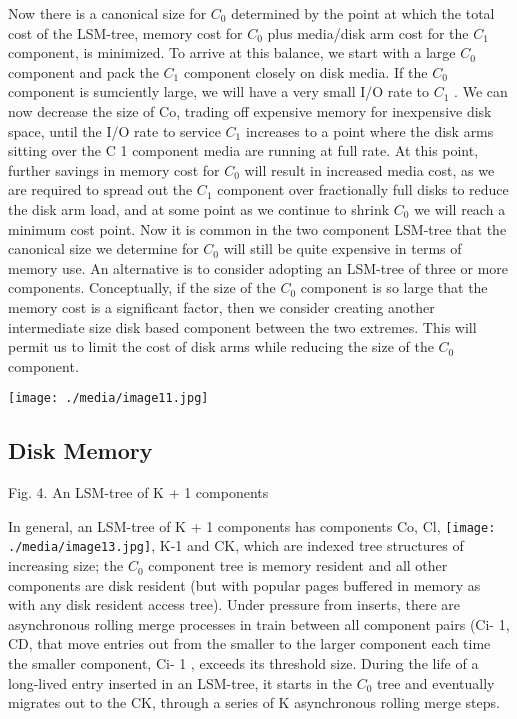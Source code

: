 \documentclass[a4paper,12pt,notitlepage,twoside,openright]{article}
\begin{document}
Now there is a canonical size for \(C_0\) determined by the point at which
the total cost of the LSM-tree, memory cost for \(C_0\) plus media/disk arm
cost for the \(C_1\) component, is minimized. To arrive at this balance, we
start with a large \(C_0\) component and pack the \(C_1\) component closely on
disk media. If the \(C_0\) component is sumciently large, we will have a very
small I/O rate to \(C_1\) . We can now decrease the size of Co, trading off
expensive memory for inexpensive disk space, until the I/O rate to
service \(C_1\) increases to a point where the disk arms sitting over the C 1
component media are running at full rate. At this point, further savings
in memory cost for \(C_0\) will result in increased media cost, as we are
required to spread out the \(C_1\) component over fractionally full disks to
reduce the disk arm load, and at some point as we continue to shrink \(C_0\)
we will reach a minimum cost point. Now it is common in the two
component LSM-tree that the canonical size we determine for \(C_0\) will
still be quite expensive in terms of memory use. An alternative is to
consider adopting an LSM-tree of three or more components. Conceptually,
if the size of the \(C_0\) component is so large that the memory cost is a
significant factor, then we consider creating another intermediate size
disk based component between the two extremes. This will permit us to
limit the cost of disk arms while reducing the size of the \(C_0\) component.

\texttt{[image: ./media/image11.jpg]}


\hypertarget{disk-memory}{%
\subsection{ Disk Memory}\label{disk-memory}}


Fig. 4. An LSM-tree of K + 1 components

In general, an LSM-tree of K + 1 components has components Co, Cl,
\texttt{[image: ./media/image13.jpg]},
K-1 and CK, which are indexed tree structures of increasing size; the \(C_0\)
component tree is memory resident and all other components are disk
resident (but with popular pages buffered in memory as with any disk
resident access tree). Under pressure from inserts, there are
asynchronous rolling merge processes in train between all component
pairs (Ci- 1, CD, that move entries out from the smaller to the larger
component each time the smaller component, Ci- 1 , exceeds its threshold
size. During the life of a long-lived entry inserted in an LSM-tree, it
starts in the \(C_0\) tree and eventually migrates out to the CK, through a
series of K asynchronous rolling merge steps.
\end{document}
